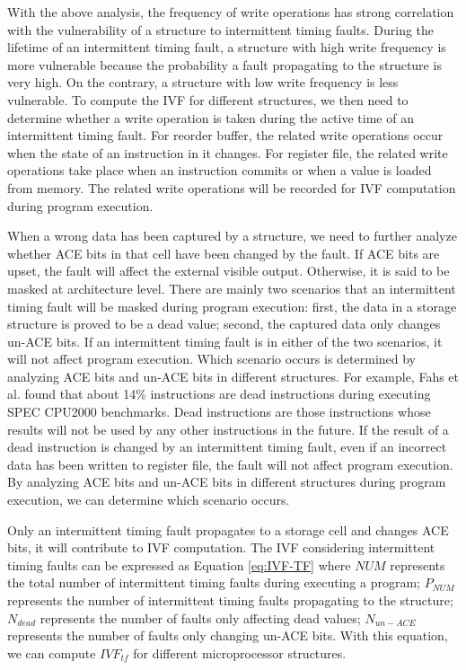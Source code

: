 With the above analysis, the frequency of write operations has strong correlation with the vulnerability of a structure to intermittent timing faults. During the lifetime of an intermittent timing fault, a structure with high write frequency is more vulnerable because the probability a fault propagating to the structure is very high. On the contrary, a structure with low write frequency is less vulnerable. To compute the IVF for different structures, we then need to determine whether a write operation is taken during the active time of an intermittent timing fault. For reorder buffer, the related write operations occur when the state of an instruction in it changes. For register file, the related write operations take place when an instruction commits or when a value is loaded from memory. The related write operations will be recorded for IVF computation during program execution.

When a wrong data has been captured by a structure, we need to further analyze whether ACE bits in that cell have been changed by the fault. If ACE bits are upset, the fault will affect the external visible output. Otherwise, it is said to be masked at architecture level. There are mainly two scenarios that an intermittent timing fault will be masked during program execution: first, the data in a storage structure is proved to be a dead value; second, the captured data only changes un-ACE bits. If an intermittent timing fault is in either of the two scenarios, it will not affect program execution. Which scenario occurs is determined by analyzing ACE bits and un-ACE bits in different structures. For example, Fahs et al. \cite{fahs2001performance} found that about 14\% instructions are dead instructions during executing SPEC CPU2000 benchmarks. Dead instructions are those instructions whose results will not be used by any other instructions in the future. If the result of a dead instruction is changed by an intermittent timing fault, even if an incorrect data has been written to register file, the fault will not affect program execution. By analyzing ACE bits and un-ACE bits in different structures during program execution, we can determine which scenario occurs.

Only an intermittent timing fault propagates to a storage cell and changes ACE bits, it will contribute to IVF computation. The IVF considering intermittent timing faults can be expressed as Equation \ref{eq:IVF-TF} where $NUM$ represents the total number of intermittent timing faults during executing a program; $P_{NUM}$ represents the number of intermittent timing faults propagating to the structure; $N_{dead}$ represents the number of faults only affecting dead values; $N_{un-ACE}$represents the number of faults only changing un-ACE bits. With this equation, we can compute $IVF_{tf}$ for different microprocessor structures.

